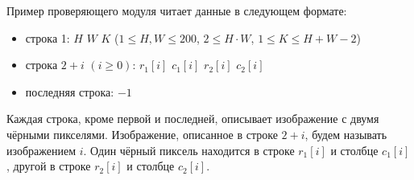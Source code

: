 Пример проверяющего модуля читает данные в следующем формате:
\begin{itemize}
\item строка 1: $H$ $W$ $K$ ($1 \leq H, W \leq 200$, $2 \leq H \cdot W$, $1 \leq K \leq H+W-2$)
\item строка $2+i$ $(i \geq 0)$: $r_1[i]$ $c_1[i]$ $r_2[i]$ $c_2[i]$
\item последняя строка: $-1$
\end{itemize}

Каждая строка, кроме первой и последней, описывает изображение с двумя
чёрными пикселями. Изображение, описанное в строке $2+i$, будем называть
изображением $i$. Один чёрный пиксель находится в строке $r_1[i]$ и столбце $c_1[i]$,
другой в строке $r_2[i]$ и столбце $c_2[i]$.

